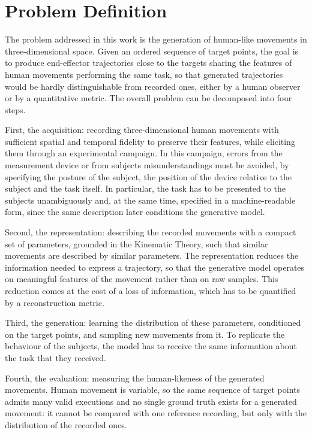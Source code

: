 \documentclass[12pt]{report}
\begin{document}
\section{Problem Definition}
The problem addressed in this work is the generation of human-like movements in three-dimensional space. Given an ordered sequence of target points, the goal is to produce end-effector trajectories close to the targets sharing the features of human movements performing the same task, so that generated trajectories would be hardly distinguishable from recorded ones, either by a human observer or by a quantitative metric. The overall problem can be decomposed into four steps.

First, the acquisition: recording three-dimensional human movements with sufficient spatial and temporal fidelity to preserve their features, while eliciting them through an experimental campaign. In this campaign, errors from the measurement device or from subjects misunderstandings must be avoided, by specifying the posture of the subject, the position of the device relative to the subject and the task itself. In particular, the task has to be presented to the subjects unambiguously and, at the same time, specified in a machine-readable form, since the same description later conditions the generative model.

Second, the representation: describing the recorded movements with a compact set of parameters, grounded in the Kinematic Theory, such that similar movements are described by similar parameters. The representation reduces the information needed to express a trajectory, so that the generative model operates on meaningful features of the movement rather than on raw samples. This reduction comes at the cost of a loss of information, which has to be quantified by a reconstruction metric.

Third, the generation: learning the distribution of these parameters, conditioned on the target points, and sampling new movements from it. To replicate the behaviour of the subjects, the model has to receive the same information about the task that they received.

Fourth, the evaluation: measuring the human-likeness of the generated movements. Human movement is variable, so the same sequence of target points admits many valid executions and no single ground truth exists for a generated movement: it cannot be compared with one reference recording, but only with the distribution of the recorded ones.
\end{document}
